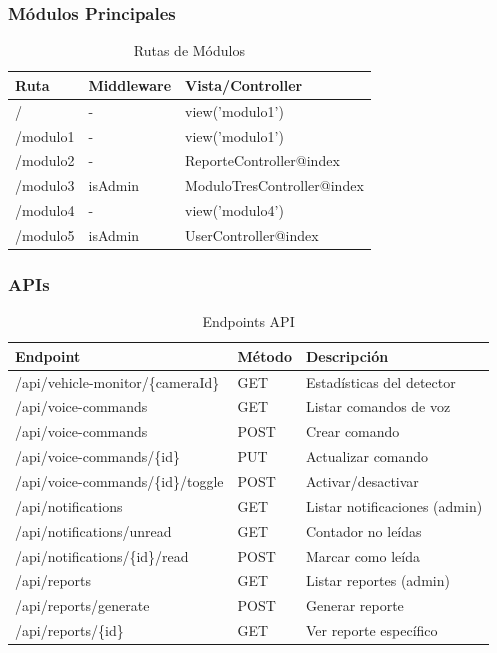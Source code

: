 \subsubsection{Módulos Principales}

\begin{table}[H]
\centering
\begin{tabular}{|l|l|l|}
\hline
\textbf{Ruta} & \textbf{Middleware} & \textbf{Vista/Controller} \\
\hline
/ & - & view('modulo1') \\
/modulo1 & - & view('modulo1') \\
/modulo2 & - & ReporteController@index \\
/modulo3 & isAdmin & ModuloTresController@index \\
/modulo4 & - & view('modulo4') \\
/modulo5 & isAdmin & UserController@index \\
\hline
\end{tabular}
\caption{Rutas de Módulos}
\end{table}

\subsubsection{APIs}

\begin{table}[H]
\centering
\small
\begin{tabular}{|l|l|p{5cm}|}
\hline
\textbf{Endpoint} & \textbf{Método} & \textbf{Descripción} \\
\hline
/api/vehicle-monitor/\{cameraId\} & GET & Estadísticas del detector \\
\hline
/api/voice-commands & GET & Listar comandos de voz \\
/api/voice-commands & POST & Crear comando \\
/api/voice-commands/\{id\} & PUT & Actualizar comando \\
/api/voice-commands/\{id\}/toggle & POST & Activar/desactivar \\
\hline
/api/notifications & GET & Listar notificaciones (admin) \\
/api/notifications/unread & GET & Contador no leídas \\
/api/notifications/\{id\}/read & POST & Marcar como leída \\
\hline
/api/reports & GET & Listar reportes (admin) \\
/api/reports/generate & POST & Generar reporte \\
/api/reports/\{id\} & GET & Ver reporte específico \\
\hline
\end{tabular}
\caption{Endpoints API}
\end{table}


